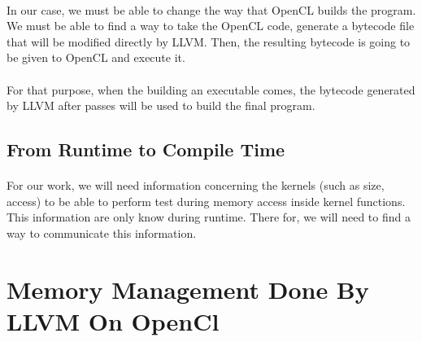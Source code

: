 \documentclass{article}
\begin{document}
\begin{itemize}
\paragraph{}
In our case, we must be able to change the way that OpenCL builds the program. We must be able to find a way to take the OpenCL code, generate a bytecode file that will be modified directly by LLVM. Then, the resulting bytecode is going to be given to OpenCL and execute it. 

\paragraph{}
For that purpose, when the building an executable comes, the bytecode generated by LLVM after passes will be used to build the final program.

\subsection{From Runtime to Compile Time}

\paragraph{}
For our work, we will need information concerning the kernels (such as size, access) to be able to perform test during memory access inside kernel functions. This information are only know during runtime. There for, we will need to find a way to communicate this information.


\section{Memory Management Done By LLVM On OpenCl}


\end{itemize}
\end{document}
